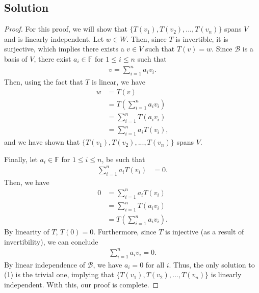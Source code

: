 \documentclass[10pt,a4paper]{article}
\theoremstyle{definition}
\begin{document}
\subsection*{Solution}
\begin{proof}
For this proof, we will show that $\{T(v_1), T(v_2),..., T(v_n) \}$ spans $V$ and is linearly independent. Let $w \in W$. Then, since $T$ is invertible, it is surjective, which implies there exists a $v \in V$ such that $T(v) = w$. Since $\mathcal{B}$ is a basis of $V$, there exist $a_i \in \mathbb{F}$ for $1 \leq i \leq n$ such that 
\begin{align*}
v = \sum_{i = 1}^n a_iv_i.
\end{align*}
Then, using the fact that $T$ is linear, we have
\begin{align*}
w &= T(v)\\
&= T \left( \sum_{i = 1}^n a_i v_i \right)\\
&= \sum_{i = 1}^n T(a_iv_i)\\
&= \sum_{i = 1}^n a_i T(v_i),
\end{align*}
and we have shown that $\{T(v_1), T(v_2),..., T(v_n) \}$ spans $V$. 

Finally, let $a_i \in \mathbb{F}$ for $1 \leq i \leq n$, be such that 
\begin{align}
\sum_{i = 1}^n a_i T(v_i) &= 0.
\end{align}
Then, we have
\begin{align*}
0 &= \sum_{i = 1}^n a_i T(v_i)\\
&= \sum_{i = 1}^n T(a_iv_i)\\
&= T \left( \sum_{i = 1}^n a_i v_i \right).
\end{align*}
By linearity of $T$, $T(0) = 0$. Furthermore, since $T$ is injective (as a result of invertibility), we can conclude 
\begin{align*}
\sum_{i = 1}^n a_i v_i = 0.
\end{align*}
By linear independence of $\mathcal{B}$, we have $a_i = 0$ for all $i$. Thus, the only solution to (1) is the trivial one, implying that $\{T(v_1), T(v_2),..., T(v_n) \}$ is linearly independent. With this, our proof is complete.
\end{proof}
\end{document}
